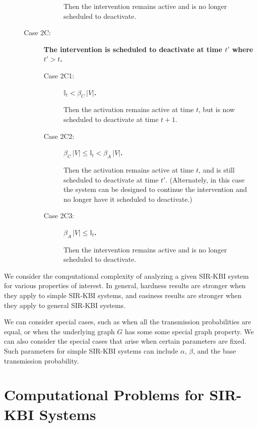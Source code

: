 \documentclass[11pt]{article}
\newcommand{\istate}{\mbox{$\mathbb{I}$}}
\begin{document}
\begin{description}
\begin{description}
\begin{description}
Then the intervention remains active and is no longer scheduled to deactivate.
\end{description}
\item
[Case 2C:]
{\bf The intervention is scheduled to deactivate at time $t'$ where $t' > t$.}
\begin{description}
\item
[Case 2C1:] 
{\bf $\istate_t < \beta_C \, |V|$.}

Then the activation remains active at time $t$,
but is now scheduled to deactivate at time $t+1$.
\item
[Case 2C2:] 
{\bf $\beta_C \, |V| \leq \istate_t < \beta_A \, |V|$.}

Then the activation remains active at time $t$,
and is still scheduled to deactivate at time $t'$.
(Alternately, in this case the system can be designed 
to continue the intervention and no longer have it scheduled to deactivate.)
\item
[Case 2C3:] 
{\bf $\beta_A \, |V| \leq \istate_t$.}

Then the intervention remains active and is no longer scheduled to deactivate.
\end{description}


\end{description}

\end{description}



\bigskip

We consider the computational complexity of analyzing a given SIR-KBI system 
for various properties of interest.
In general, hardness results are stronger when they apply to simple SIR-KBI systems,
and easiness results are stronger when they apply to general SIR-KBI systems.

We can consider special cases, such as when all the transmission probabilities are equal,
or when the underlying graph $G$ has some some special graph property.
We can also consider the special cases that arise when certain parameters are fixed.
Such parameters for simple  SIR-KBI systems 
can include $\alpha$, $\beta$, and the base transmission probability.






\section{Computational Problems for SIR-KBI Systems}
\label{sec:computational_problems}
\end{document}
